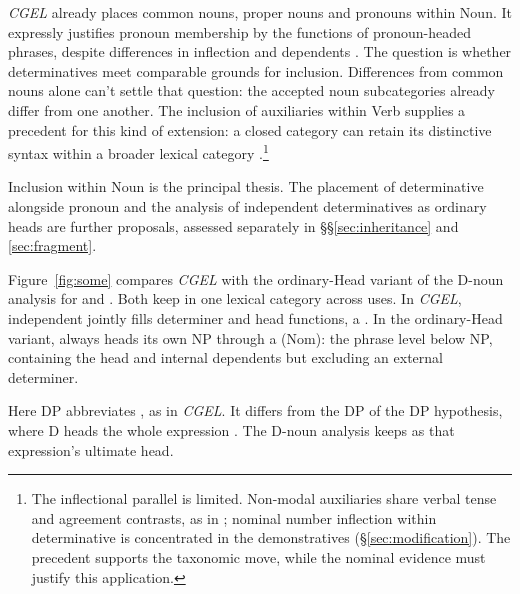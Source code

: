 \documentclass[12pt]{article}
\begin{document}
\textit{CGEL} already places common nouns, proper nouns and pronouns within Noun. It expressly justifies pronoun membership by the functions of pronoun-headed phrases, despite differences in inflection and dependents \citep[327--328]{huddleston2002}. The question is whether determinatives meet comparable grounds for inclusion. Differences from common nouns alone can't settle that question: the accepted noun subcategories already differ from one another. The inclusion of auxiliaries within Verb supplies a precedent for this kind of extension: a closed category can retain its distinctive syntax within a broader lexical category \citep{pullumwilson1977}.\footnote{The inflectional parallel is limited. Non-modal auxiliaries share verbal tense and agreement contrasts, as in ; nominal number inflection within determinative is concentrated in the demonstratives (§\ref{sec:modification}). The precedent supports the taxonomic move, while the nominal evidence must justify this application.}

Inclusion within Noun is the principal thesis. The placement of determinative alongside pronoun and the analysis of independent determinatives as ordinary heads are further proposals, assessed separately in §§\ref{sec:inheritance} and \ref{sec:fragment}.

Figure~\ref{fig:some} compares \textit{CGEL} with the ordinary-Head variant of the D-noun analysis for  and . Both keep  in one lexical category across uses. In \textit{CGEL}, independent  jointly fills determiner and head functions, a  \citep[410--412]{huddleston2002}. In the ordinary-Head variant,  always heads its own NP through a  (Nom): the phrase level below NP, containing the head and internal dependents but excluding an external determiner.

Here DP abbreviates , as in \textit{CGEL}. It differs from the DP of the DP hypothesis, where D heads the whole expression  \citep{abney1987}. The D-noun analysis keeps  as that expression's ultimate head.
\end{document}
